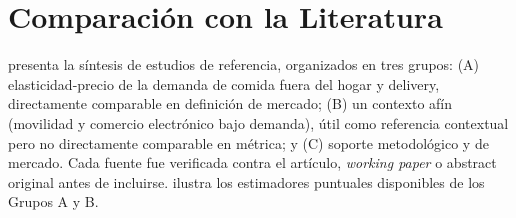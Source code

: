 \documentclass[doc, a4paper, biblatex, floatsintext, longtable, babel]{apa7}
\begin{document}
\section{Comparaci\'on con la Literatura}
\label{sec:comparacion}

 presenta la s\'intesis de estudios de referencia, organizados en tres grupos: (A) elasticidad-precio de la demanda de comida fuera del hogar y delivery, directamente comparable en definici\'on de mercado; (B) un contexto af\'in (movilidad y comercio electr\'onico bajo demanda), \'util como referencia contextual pero no directamente comparable en m\'etrica; y (C) soporte metodol\'ogico y de mercado. Cada fuente fue verificada contra el art\'iculo, \textit{working paper} o abstract original antes de incluirse.  ilustra los estimadores puntuales disponibles de los Grupos A y B.
\end{document}
